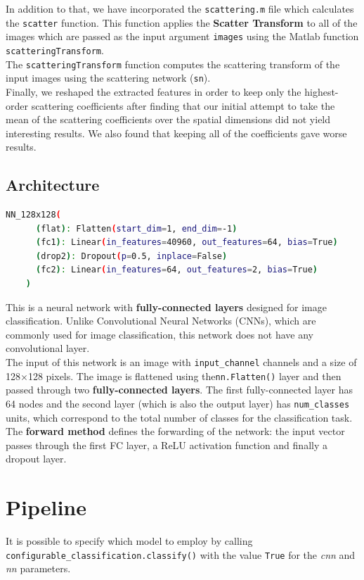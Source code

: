 \documentclass{report}
\begin{document}
In addition to that, we have incorporated the \texttt{scattering.m} file which calculates the \texttt{scatter} function. This function applies the 
\textbf{Scatter Transform} to all of the images which are passed as the input argument \texttt{images} using the Matlab function \texttt{scatteringTransform}. \\
The \texttt{scatteringTransform} function computes the scattering transform of the input images using the scattering network 
(\texttt{sn}).\\

Finally, we reshaped the extracted features in order to keep only the highest-order scattering coefficients after finding that our initial attempt 
to take the mean of the scattering coefficients over the spatial dimensions did not yield interesting results. We also found that keeping 
all of the coefficients gave worse results.


\subsection{Architecture}
\begin{lstlisting}[language=bash]
    NN_128x128(
      (flat): Flatten(start_dim=1, end_dim=-1)
      (fc1): Linear(in_features=40960, out_features=64, bias=True)
      (drop2): Dropout(p=0.5, inplace=False)
      (fc2): Linear(in_features=64, out_features=2, bias=True)
    )
    \end{lstlisting}
This is a neural network with \textbf{fully-connected layers} designed for image classification. Unlike Convolutional Neural Networks (CNNs), 
which are commonly used for image classification, this network does not have any convolutional layer. \\
The input of this network is an image with \texttt{input\_channel} channels and a size of 128$\times$128 pixels. The image is flattened 
using the\texttt{nn.Flatten()} layer and then passed through two \textbf{fully-connected layers}. The first fully-connected layer has 64 nodes 
and the second layer (which is also the output layer) has \texttt{num\_classes} units, which correspond to the total number of classes for the classification task.\\

The \textbf{forward method} defines the forwarding of the network: the input vector passes through the first FC layer, a ReLU activation function and finally a dropout layer.

\section{Pipeline}
It is possible to specify which model to employ by calling \texttt{configurable\_classification.classify()} with the value \texttt{True} for the
\textit{cnn} and \textit{nn} parameters.\\
\end{document}

